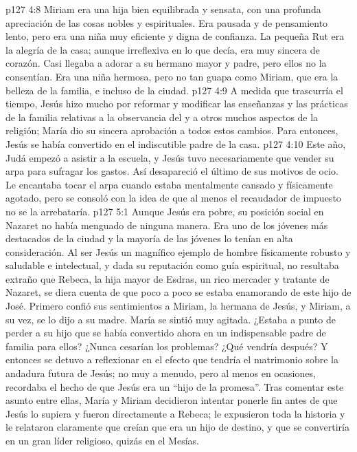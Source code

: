 \vs p127 4:8 Miriam era una hija bien equilibrada y sensata, con una profunda apreciación de las cosas nobles y espirituales. Era pausada y de pensamiento lento, pero era una niña muy eficiente y digna de confianza. La pequeña Rut era la alegría de la casa; aunque irreflexiva en lo que decía, era muy sincera de corazón. Casi llegaba a adorar a su hermano mayor y padre, pero ellos no la consentían. Era una niña hermosa, pero no tan guapa como Miriam, que era la belleza de la familia, e incluso de la ciudad.
\vs p127 4:9 \pc A medida que trascurría el tiempo, Jesús hizo mucho por reformar y modificar las enseñanzas y las prácticas de la familia relativas a la observancia del  y a otros muchos aspectos de la religión; María dio su sincera aprobación a todos estos cambios. Para entonces, Jesús se había convertido en el indiscutible padre de la casa.
\vs p127 4:10 Este año, Judá empezó a asistir a la escuela, y Jesús tuvo necesariamente que vender su arpa para sufragar los gastos. Así desapareció el último de sus motivos de ocio. Le encantaba tocar el arpa cuando estaba mentalmente cansado y físicamente agotado, pero se consoló con la idea de que al menos el recaudador de impuesto no se la arrebataría.
\vs p127 5:1 Aunque Jesús era pobre, su posición social en Nazaret no había menguado de ninguna manera. Era uno de los jóvenes más destacados de la ciudad y la mayoría de las jóvenes lo tenían en alta consideración. Al ser Jesús un magnífico ejemplo de hombre físicamente robusto y saludable e intelectual, y dada su reputación como guía espiritual, no resultaba extraño que Rebeca, la hija mayor de Esdras, un rico mercader y tratante de Nazaret, se diera cuenta de que poco a poco se estaba enamorando de este hijo de José. Primero confió sus sentimientos a Miriam, la hermana de Jesús, y Miriam, a su vez, se lo dijo a su madre. María se sintió muy agitada. ¿Estaba a punto de perder a su hijo que se había convertido ahora en un indispensable padre de familia para ellos? ¿Nunca cesarían los problemas? ¿Qué vendría después? Y entonces se detuvo a reflexionar en el efecto que tendría el matrimonio sobre la andadura futura de Jesús; no muy a menudo, pero al menos en ocasiones, recordaba el hecho de que Jesús era un “hijo de la promesa”. Tras comentar este asunto entre ellas, María y Miriam decidieron intentar ponerle fin antes de que Jesús lo supiera y fueron directamente a Rebeca; le expusieron toda la historia y le relataron claramente que creían que era un hijo de destino, y que se convertiría en un gran líder religioso, quizás en el Mesías.

